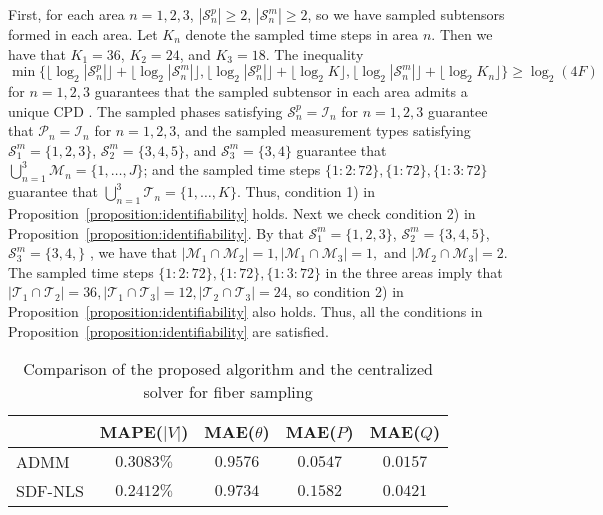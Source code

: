 \documentclass[journal]{IEEEtran}
\newcounter{propose}
\newcounter{thm}
\newcommand{\floor}[1]{\lfloor \log_2{#1}\rfloor}
\begin{document}
First, for each area $n=1,2,3$, $|\mathcal{S}_n^p|\geq 2$, $|\mathcal{S}_n^m|\geq 2$, so we have sampled subtensors formed in each area.
Let $K_n$ denote the sampled time steps in area $n$. Then we have that $K_1=36$, $K_2=24$, and $K_3=18$. The inequality $\min \big\{ \floor{|\mathcal{S}_n^{p}|} + \floor{|\mathcal{S}_n^{m}|}, \floor{|\mathcal{S}_n^{p}|} + \floor{K}, \floor{|\mathcal{S}_n^{m}|} + \floor{K_n}\big\} \geq \log_2(4 F)$ for $n=1,2,3$ guarantees that the 
sampled  subtensor in each area admits a unique CPD \cite{Kanatsoulis2020}. 
 The sampled phases satisfying $\mathcal{S}_n^p=\mathcal{I}_n$ for $n=1,2,3$ guarantee that $\mathcal{P}_n=\mathcal{I}_n$ for $n=1,2,3$, and the sampled measurement types satisfying $\mathcal{S}_1^m =\{1,2,3\}$, $\mathcal{S}_2^m =\{3,4,5\}$, and $\mathcal{S}_3^m =\{3,4\}$ guarantee that $\bigcup_{n=1}^3 \mathcal{M}_n=\{1,\ldots,J\}$; and  the sampled time steps $\{1:2:72\}, \{1:72\}, \{1:3:72\}$  guarantee that $\bigcup_{n=1}^3 \mathcal{T}_n=\{1,\ldots, K\}$. Thus, condition 1) in Proposition~\ref{proposition:identifiability} holds. Next we check condition 2) in Proposition~\ref{proposition:identifiability}. By that $\mathcal{S}_1^m =\{1,2,3\}$, $\mathcal{S}_2^m =\{3,4,5\}$, $\mathcal{S}_3^m =\{3,4,\}$ , we have that $|\mathcal{M}_1\cap \mathcal{M}_2|=1, |\mathcal{M}_1\cap \mathcal{M}_3|=1,$ and $|\mathcal{M}_2\cap \mathcal{M}_3|=2$. The sampled time steps $\{1:2:72\}, \{1:72\}, \{1:3:72\}$ in the three areas  imply that $|\mathcal{T}_1\cap \mathcal{T}_2|=36, |\mathcal{T}_1\cap \mathcal{T}_3|=12, |\mathcal{T}_2\cap \mathcal{T}_3|=24$, so condition 2) in   Proposition~\ref{proposition:identifiability} also holds. Thus, all the conditions in Proposition~\ref{proposition:identifiability} are satisfied.

\begin{table}
	\renewcommand{\arraystretch}{1}
	\caption{Comparison of the proposed algorithm and the centralized solver for fiber sampling}\vspace{-10pt}
\label{tab:comparisonofadmmsdffiber}
	\begin{center}
		\begin{tabular}{l c c c c } 
			\toprule
	            & MAPE($|V|$)  & MAE($\theta$) & MAE($P$) & MAE($Q$) \\
			\midrule
			ADMM &  $0.3083\%$ & $0.9576$ & $0.0547$ & $ 0.0157$ \\
		SDF-NLS & $0.2412\%$ & $0.9734 $ & $0.1582$ & $0.0421$\\
		\bottomrule
		\end{tabular}\vspace{-15pt}
	\end{center}
\end{table}
\end{document}
